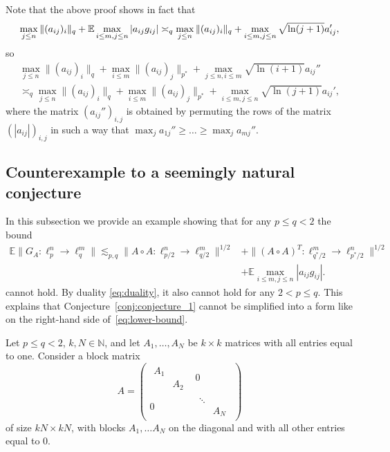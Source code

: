 \documentclass[a4paper]{amsart}
\theoremstyle{definition}
\theoremstyle{remark}
\numberwithin{equation}{section}
\newcommand*{\NN}{\mathbb{N}}
\newcommand*{\EE}{\mathbb{E}}
\newcommand*{\hadprod}{\mathbin{\circ}} %
\begin{document}
Note that the above proof  shows in fact that
\begin{equation*}	
	 \max_{j\le n} \|(a_{ij})_{i}\|_q + \EE \max_{i \le m,j\le n} |a_{ij}g_{ij}| 
	\\
	\asymp_{q} \max_{j\le n} \|(a_{ij})_{i}\|_q +\max_{i\le m, j\le n}\sqrt{\ln (j+1)} a_{ij}',
\end{equation*}
so
\begin{multline}	\label{eq:Emax-random-vs-max-deterministic}
	 \max_{j\le n} \|(a_{ij})_{i}\|_q + \max_{i\le m} \|(a_{ij})_{j}\|_{p^\ast} + \max_{j\le n, i \le m} \sqrt{\ln (i+1)} a_{ij}''	\\
	\asymp_{q} \max_{j\le n} \|(a_{ij})_{i}\|_q + \max_{i\le m} \|(a_{ij})_{j}\|_{p^\ast} +\max_{i\le m, j\le n}\sqrt{\ln (j+1)} a_{ij}',
	\end{multline}
	where the matrix $(a_{ij}'')_{i,j}$  is obtained by permuting the rows of the matrix $(|a_{ij}|)_{i,j}$ in such a way that $\max_j a_{1j}''\ge \dots \ge \max_j a_{mj}''$.


\subsection{Counterexample to a seemingly natural conjecture}
\label{subsection:counterexample}
In this subsection we provide an example showing that for any $p\le q <2$ the bound 
\begin{align}
\EE \|G_A\colon \ell_{p}^n\to\ell_q^m\| \lesssim_{p,q}  \|A\hadprod A \colon \ell^n_{p/2} \to \ell^m_{q/2} \|^{1/2} &+ \|(A\hadprod A)^T \colon \ell^m_{q^*/2} \to \ell^n_{p^*/2}\|^{1/2} \nonumber\\
&+ \EE\max_{i\leq m, j\leq n}|a_{ij}g_{ij}|.
\label{eq:upper-bound-fails}
\end{align}
cannot hold. By duality \eqref{eq:duality}, it also cannot hold for any $2<p\le q$. This explains that   Conjecture~\ref{conj:conjecture_1} cannot be simplified into a form like on the right-hand side of~\eqref{eq:lower-bound}.

Let  $p\le q <2$, $k, N\in \NN$, and let $A_1, \ldots, A_N$ be $k\times k$ matrices with all entries equal to one. Consider a block matrix
\[
A = 
\begin{pmatrix}
\begin{matrix}
A_1 &     \\
& A_2
\end{matrix}
&       0        \\
0           &  \begin{matrix}
\ddots &     \\
& A_N
\end{matrix}       
\end{pmatrix}
\]
of size $kN \times kN$, with  blocks $A_1, \ldots A_N$ on the diagonal and with all other entries equal to $0$.
\end{document}
